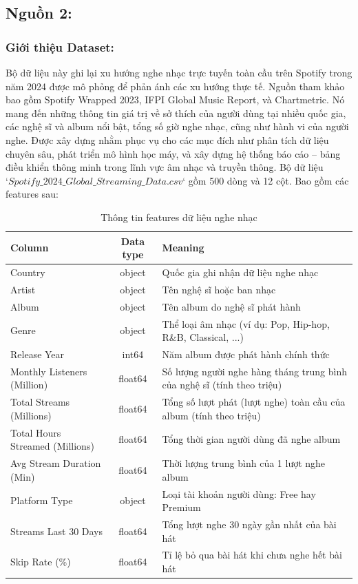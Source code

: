 \subsection{Nguồn 2: }
\subsubsection{Giới thiệu Dataset:}
Bộ dữ liệu này ghi lại xu hướng nghe nhạc trực tuyến toàn cầu trên Spotify trong năm 2024 được mô phỏng để phản ánh các xu hướng thực tế. Nguồn tham khảo bao gồm Spotify Wrapped 2023, IFPI Global Music Report, và Chartmetric. Nó mang đến những thông tin giá trị về sở thích của người dùng tại nhiều quốc gia, các nghệ sĩ và album nổi bật, tổng số giờ nghe nhạc, cũng như hành vi của người nghe. Được xây dựng nhằm phục vụ cho các mục đích như phân tích dữ liệu chuyên sâu, phát triển mô hình học máy, và xây dựng hệ thống báo cáo – bảng điều khiển thông minh trong lĩnh vực âm nhạc và truyền thông.\newline
Bộ dữ liệu $‘Spotify\_2024\_Global\_Streaming\_Data.csv‘$ gồm 500 dòng và 12 cột. Bao gồm các features sau:

\begin{table}[h!]
\centering
\renewcommand{\arraystretch}{1.2} %
\begin{tabularx}{\textwidth}{|>{\raggedright\arraybackslash}X|c|>{\raggedright\arraybackslash}X|}
\hline
\textbf{Column} & \textbf{Data type} & \textbf{Meaning} \\
\hline
Country & object  & Quốc gia ghi nhận dữ liệu nghe nhạc \\
\hline
Artist & object  & Tên nghệ sĩ hoặc ban nhạc \\
\hline
Album & object  & Tên album do nghệ sĩ phát hành \\
\hline
Genre & object  & Thể loại âm nhạc (ví dụ: Pop, Hip-hop, R\&B, Classical, ...) \\
\hline
Release Year & int64  & Năm album được phát hành chính thức \\
\hline
Monthly Listeners (Million) & float64 & Số lượng người nghe hàng tháng trung bình của nghệ sĩ (tính theo triệu) \\
\hline
Total Streams (Millions) & float64 & Tổng số lượt phát (lượt nghe) toàn cầu của album (tính theo triệu) \\
\hline
Total Hours Streamed (Millions) & float64 & Tổng thời gian người dùng đã nghe album \\
\hline
Avg Stream Duration (Min) & float64 & Thời lượng trung bình của 1 lượt nghe album \\
\hline
Platform Type & object & Loại tài khoản người dùng: Free hay Premium \\
\hline
Streams Last 30 Days & float64 & Tổng lượt nghe 30 ngày gần nhất của bài hát \\
\hline
Skip Rate (\%) & float64 & Tỉ lệ bỏ qua bài hát khi chưa nghe hết bài hát \\
\hline
\end{tabularx}
\caption{Thông tin features dữ liệu nghe nhạc}
\end{table}
